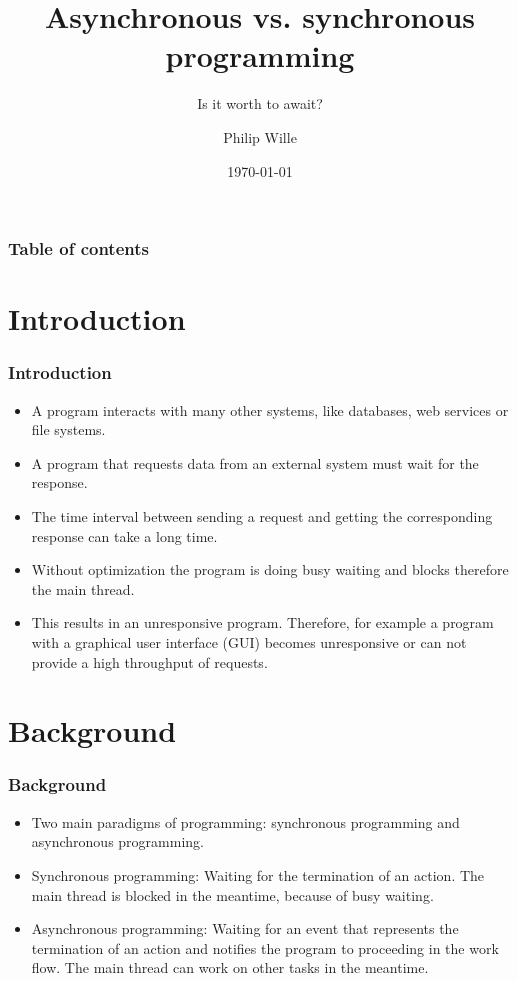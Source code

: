 \documentclass[xcolor=dvipsnames]{beamer}
\title{Asynchronous vs. synchronous programming}
\subtitle{Is it worth to await?}
\author{Philip Wille}
\institute[UIBK]
{
    \inst{1}%
    Fakultät Informatik\\
    Universität Innsbruck
}
\date{\today}
\begin{document}
    \frame{\maketitle}

    \begin{frame}
        \frametitle{Table of contents}
        \tableofcontents
    \end{frame}

    \section{Introduction}
    \begin{frame}
        \frametitle{Introduction}
        \begin{itemize}
            \item A program interacts with many other systems, like databases, web services or file systems.
            \item A program that requests data from an external system must wait for the response.
            \item The time interval between sending a request and getting the corresponding response can take a long time.
            \item Without optimization the program is doing busy waiting and blocks therefore the main thread.
            \item This results in an unresponsive program. Therefore, for example a program with a graphical user interface (GUI) becomes unresponsive or can not provide a high throughput of requests.
        \end{itemize}
    \end{frame}

    \section{Background}
    \begin{frame}
        \frametitle{Background}
        \begin{itemize}
            \item Two main paradigms of programming: \alert{synchronous programming} and \alert{asynchronous programming}.
            \item Synchronous programming: \alert{Waiting for the termination} of an action. The \alert{main thread is blocked} in the meantime, because of busy waiting.
            \item Asynchronous programming: \alert{Waiting for an event} that represents the termination of an action and \alert{notifies} the program to proceeding in the work flow. The \alert{main thread} can work on \alert{other tasks} in the meantime.
        \end{itemize}
    \end{frame}
\end{document}
